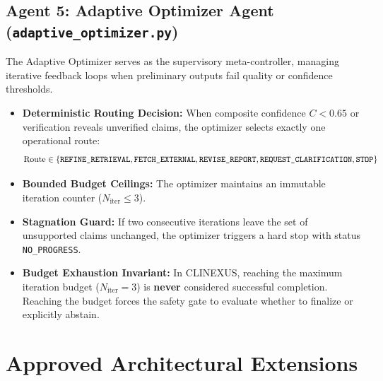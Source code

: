 \documentclass[12pt,a4paper]{report}
\begin{document}
\subsection{Agent 5: Adaptive Optimizer Agent (\texttt{adaptive\_optimizer.py})}
The Adaptive Optimizer serves as the supervisory meta-controller, managing iterative feedback loops when preliminary outputs fail quality or confidence thresholds.
\begin{itemize}
    \item \textbf{Deterministic Routing Decision:} When composite confidence $C < 0.65$ or verification reveals unverified claims, the optimizer selects exactly one operational route:
    \begin{equation}
        \text{Route} \in \{\text{\texttt{REFINE\_RETRIEVAL}}, \text{\texttt{FETCH\_EXTERNAL}}, \text{\texttt{REVISE\_REPORT}}, \text{\texttt{REQUEST\_CLARIFICATION}}, \text{\texttt{STOP}}\}
    \end{equation}
    \item \textbf{Bounded Budget Ceilings:} The optimizer maintains an immutable iteration counter ($N_{\text{iter}} \le 3$). 
    \item \textbf{Stagnation Guard:} If two consecutive iterations leave the set of unsupported claims unchanged, the optimizer triggers a hard stop with status \texttt{NO\_PROGRESS}.
    \item \textbf{Budget Exhaustion Invariant:} In CLINEXUS, reaching the maximum iteration budget ($N_{\text{iter}} = 3$) is \textbf{never} considered successful completion. Reaching the budget forces the safety gate to evaluate whether to finalize or explicitly abstain.
\end{itemize}

\section{Approved Architectural Extensions}
\end{document}
